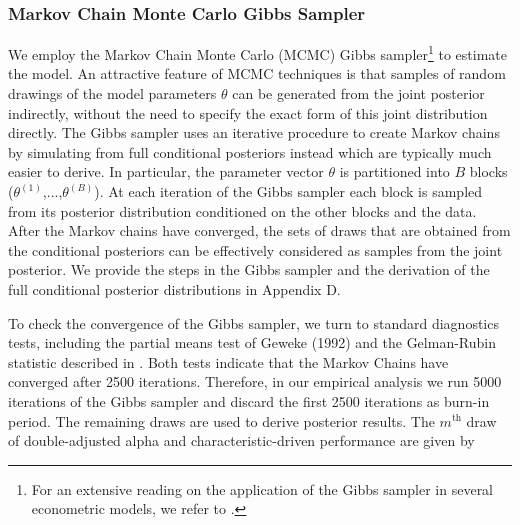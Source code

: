 \subsubsection{Markov Chain Monte Carlo Gibbs Sampler}
We employ the Markov Chain Monte Carlo (MCMC) Gibbs sampler\footnote{For an extensive reading on the application of the Gibbs sampler in several econometric models, we refer to \citet{de2006gibbs}.} to estimate the model. An attractive feature of MCMC techniques is that samples of random drawings of the model parameters $\theta$ can be generated from the joint posterior indirectly, without the need to specify the exact form of this joint distribution directly. The Gibbs sampler uses an iterative procedure to create Markov chains by simulating from full conditional posteriors instead which are typically much easier to derive. In particular, the parameter vector $\theta$ is partitioned into $B$ blocks ($\theta^{(1)}$,...,$\theta^{(B)}$). At each iteration of the Gibbs sampler each block is sampled from its posterior distribution conditioned on the other blocks and the data. After the Markov chains have converged, the sets of draws that are obtained from the conditional posteriors can be effectively considered as samples from the joint posterior. We provide the steps in the Gibbs sampler and the derivation of the full conditional posterior distributions in Appendix D. 
\par To check the convergence of the Gibbs sampler, we turn to standard diagnostics tests, including the partial means test of Geweke (1992) and the Gelman-Rubin statistic described in \citet{gelman2014bayesian}. Both tests indicate that the Markov Chains have converged after 2500 iterations. Therefore, in our empirical analysis we run 5000 iterations of the Gibbs sampler and discard the first 2500 iterations as burn-in period. The remaining draws are used to derive posterior results. The $m^{\text{th}}$ draw of double-adjusted alpha and characteristic-driven performance are given by 
